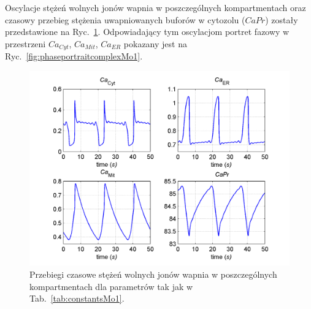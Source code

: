 Oscylacje stężeń wolnych jonów wapnia w poszczególnych kompartmentach oraz czasowy przebieg stężenia uwapniowanych buforów w cytozolu ($CaPr$) zostały przedstawione na Ryc.~\ref{fig:complexoscillationsMo1}. Odpowiadający tym oscylacjom portret fazowy w przestrzeni $Ca_{Cyt}$, $Ca_{Mit}$, $Ca_{ER}$ pokazany jest na Ryc.~\ref{fig:phaseportraitcomplexMo1}.



\begin{figure}[ht]
	\centering
	\includegraphics[width=1\textwidth]{rysunki/rozdzial_5/bursting_timecourseMo1}
	\caption[Oscylacje wapniowe typu bursting w Modelu \#1]{Przebiegi czasowe stężeń wolnych jonów  wapnia w poszczególnych kompartmentach  dla  parametrów tak jak w Tab.~\ref{tab:constantsMo1}.}
	\label{fig:complexoscillationsMo1}
\end{figure}

